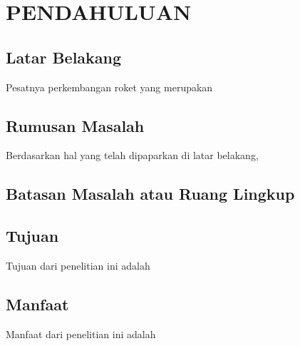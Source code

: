 \section{PENDAHULUAN}

\subsection{Latar Belakang}

Pesatnya perkembangan roket yang merupakan \lipsum[2]

\lipsum[3]

\subsection{Rumusan Masalah}

Berdasarkan hal yang telah dipaparkan di latar belakang, \lipsum[4]

\subsection{Batasan Masalah atau Ruang Lingkup}

\lipsum[6]

\subsection{Tujuan}

Tujuan dari penelitian ini adalah \lipsum[7][1-14]

\subsection{Manfaat}

Manfaat dari penelitian ini adalah \lipsum[8][1-14]
